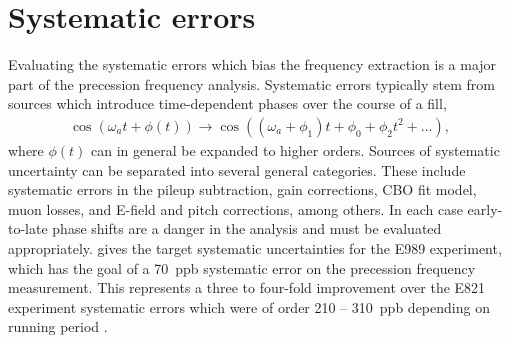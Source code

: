 
\thispagestyle{myheadings}

\graphicspath{{Body/Figures/Wa/Datasets/Endgame/LostMuonFiles/MainCuts/}{Body/Figures/Wa/Datasets/ComparisonPlots/LostMuons/}{Body/Figures/Wa/Datasets/9d/SingleIteration/LostMuonFits/}{Body/Figures/Wa/Datasets/9d/PileupJobs/PileupGapTime/}{Body/Figures/Wa/Datasets/9d/PileupJobs/PileupDeadTime/auto-scaling/}{Body/Figures/Wa/Datasets/9d/PileupJobs/PileupDeadTime/fixed-scaling/}{Body/Figures/Wa/Datasets/9d/PileupJobs/PileupEnergyScale/}{Body/Figures/Wa/Datasets/9d/PileupJobs/PileupTimeShift/}{Body/Figures/Wa/Datasets/9d/SingleIteration/PileupMultiplierScan/}{Body/Figures/Wa/Datasets/60h/RatioConstruction/Ta/}{Body/Figures/Wa/Datasets/60h/RatioConstruction/TauMu/}{Body/Figures/Wa/Datasets/9d/Binning/BinEdge/}{Body/Figures/Wa/Datasets/9d/Binning/BinWidth/}{Body/Figures/Wa/Datasets/60h/Gain/0p25-steps/}{Body/Figures/Wa/Datasets/60h/Gain/Lifetime/}{Body/Figures/Wa/Datasets/ComparisonPlots/}}




\section{Systematic errors}
\label{sec:SystematicErrors}


Evaluating the systematic errors which bias the \wa frequency extraction is a major part of the precession frequency analysis. Systematic errors typically stem from sources which introduce time-dependent phases over the course of a fill,
    \begin{align} \label{eq:timeDependentPhase}
        \cos{(\omega_{a}t + \phi(t))} \rightarrow \cos{((\omega_{a}+\phi_{1})t + \phi_{0} + \phi_{2}t^{2} + ...)},
    \end{align}
where $\phi(t)$ can in general be expanded to higher orders. Sources of systematic uncertainty can be separated into several general categories. These include systematic errors in the pileup subtraction, gain corrections, CBO fit model, muon losses, and E-field and pitch corrections, among others. In each case early-to-late phase shifts are a danger in the analysis and must be evaluated appropriately.  gives the target systematic uncertainties for the E989 experiment, which has the goal of a \SI{70}{ppb} systematic error on the precession frequency measurement. This represents a three to four-fold improvement over the E821 experiment systematic errors which were of order \SI{210}{} -- \SI{310}{ppb} depending on running period \cite{E821FinalReport}.

